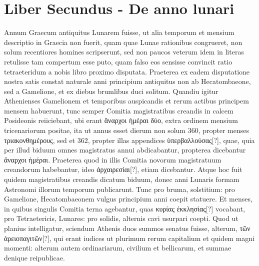 

\chapter{Liber Secundus - De anno lunari}
\normalsize

Annum Graecum antiquitus Lunarem fuisse,
ut alia temporum et mensium descriptio
in Graecia non fuerit, quam quae Lunae
rationibus congrueret, non solum recentiores
homines scripserunt, sed non paucos
veterum idem in literas retulisse tam
compertum esse puto, quam falso eos sensisse
convincit ratio tetraeteridum a nobis
libro proximo disputata.
Praeterea ex
eadem disputatione nostra satis constat naturale anni principium antiquitus
non ab Hecatombaeone, sed a Gamelione, et ex diebus brumlibus
duci solitum.
Quandiu igitur Athenienses Gamelionem et temporibus
auspicandis et rerum actibus principem mensem habuerunt,
tunc semper Comitia magistratibus creandis in calcem Posideonis
reiiciebant, ubi erant \textgreek{ἄναρχοι ἡμέραι δύο},
 extra ordinem mensium tricenariorum
positae, ita ut annus esset dierum non solum 360, propter
menses \textgreek{τριακονθημέρους}, sed et 362,
 propter illas appendices \textgreek{ὑπερβαλλούσας[?]},
quae, quia per illud biduum omnes magistratus annui abdicabantur,
propterea dicebantur \textgreek{ἄναρχοι ἡμέραι}.
Praeterea quod in illis
Comitia novorum magistratuum creandorum habebantur, ideo
\textgreek{ἀρχαιρεσίαι[?]}, etiam dicebantur.
Atque hoc fuit quidem magistratibus
creandis dicatum biduum, donec anni Lunaris formam Astronomi illorum
temporum publicarunt.
Tunc pro bruma, solstitium: pro Gamelione,
Hecatombaeonem vulgus principium anni coepit statuere.
Et
menses, in quibus singulis Comitia terna agebantur, quas
 \textgreek{κυρίας ἐκκλησίας[?]}
vocabant, pro Tetraetericis, Lunares: pro solidis, alternis cavi
usurpari coepti.
Quod ut planius intelligatur, sciendum Athenis
duos summos senatus fuisse, alterum, \textgreek{τῶν ἀρειοπαγιτῶν[?]},
 qui erant iudices
ut plurimum rerum capitalium et quidem magni momenti: alterum autem
ordinariarum, civilium et bellicarum, et summae denique reipublicae.

